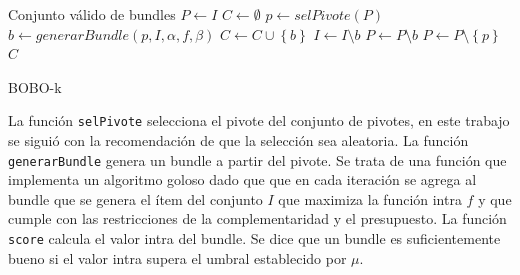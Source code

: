 \begin{algorithm}[H]
\begin{algorithmic}[1]
\ENSURE Conjunto válido de bundles
\STATE $P \leftarrow I$
\STATE $C \leftarrow \emptyset$
	\STATE $p \leftarrow selPivote(P)$
	\STATE $b \leftarrow generarBundle(p,I,\alpha,f,\beta)$
		\STATE $C \leftarrow C \cup \left\{b\right\}$
		\STATE $I \leftarrow I \setminus b$
		\STATE $P \leftarrow P \setminus b$
	\ELSE
		\STATE $P \leftarrow P \setminus \left\{p\right\}$
	\ENDIF
\ENDWHILE
\RETURN $C$
\end{algorithmic}
\caption{BOBO-k}\label{alg:bobo}
\end{algorithm}

La función \texttt{selPivote} selecciona el pivote del conjunto de pivotes, en este trabajo se siguió con la recomendación de \cite{newSimilarity} que la selección sea aleatoria. La función \texttt{generarBundle} genera un bundle a partir del pivote. Se trata de una función que implementa un algoritmo goloso dado que que en cada iteración se agrega al bundle que se genera el ítem del conjunto $I$ que maximiza la función intra $f$ y que cumple con las restricciones de la complementaridad y el presupuesto. La función \texttt{score} calcula el valor intra del bundle. Se dice que un bundle es suficientemente bueno si el valor intra supera el umbral establecido por $\mu$.\\

